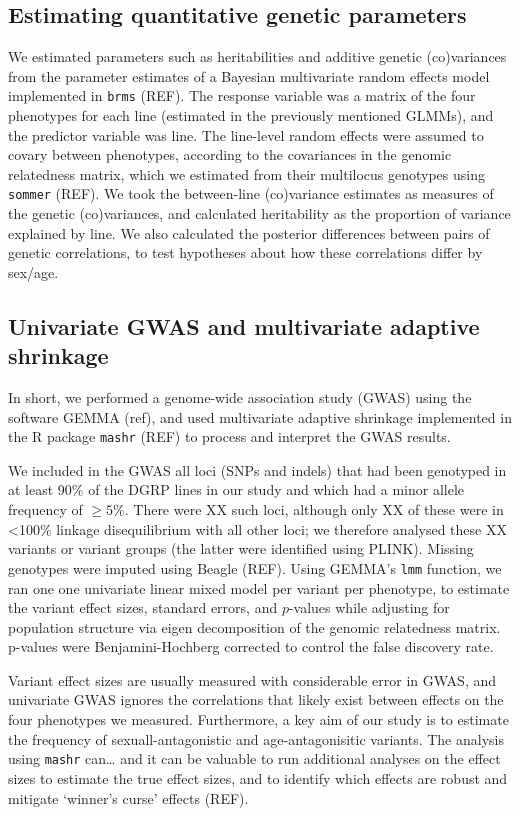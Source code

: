 \documentclass{article}
\begin{document}
\subsection*{Estimating quantitative genetic parameters}

We estimated parameters such as heritabilities and additive genetic
(co)variances from the parameter estimates of a Bayesian multivariate
random effects model implemented in \texttt{brms} (REF). The response
variable was a matrix of the four phenotypes for each line (estimated in
the previously mentioned GLMMs), and the predictor variable was line.
The line-level random effects were assumed to covary between phenotypes,
according to the covariances in the genomic relatedness matrix, which we
estimated from their multilocus genotypes using \texttt{sommer} (REF).
We took the between-line (co)variance estimates as measures of the
genetic (co)variances, and calculated heritability as the proportion of
variance explained by line. We also calculated the posterior differences
between pairs of genetic correlations, to test hypotheses about how
these correlations differ by sex/age.

\subsection*{Univariate GWAS and multivariate adaptive shrinkage}

In short, we performed a genome-wide association study (GWAS) using the
software GEMMA (ref), and used multivariate adaptive shrinkage
implemented in the R package \texttt{mashr} (REF) to process and
interpret the GWAS results.

We included in the GWAS all loci (SNPs and indels) that had been
genotyped in at least 90\% of the DGRP lines in our study and which had
a minor allele frequency of \(\ge5\%\). There were XX such loci,
although only XX of these were in \textless100\% linkage disequilibrium
with all other loci; we therefore analysed these XX variants or variant
groups (the latter were identified using PLINK). Missing genotypes were
imputed using Beagle (REF). Using GEMMA's \texttt{lmm} function, we ran
one one univariate linear mixed model per variant per phenotype, to
estimate the variant effect sizes, standard errors, and \(p\)-values
while adjusting for population structure via eigen decomposition of the
genomic relatedness matrix. p-values were Benjamini-Hochberg corrected
to control the false discovery rate.

Variant effect sizes are usually measured with considerable error in
GWAS, and univariate GWAS ignores the correlations that likely exist
between effects on the four phenotypes we measured. Furthermore, a key
aim of our study is to estimate the frequency of sexuall-antagonistic
and age-antagonisitic variants. The analysis using \texttt{mashr}
can\ldots{} and it can be valuable to run additional analyses on the
effect sizes to estimate the true effect sizes, and to identify which
effects are robust and mitigate `winner's curse' effects (REF).
\end{document}
